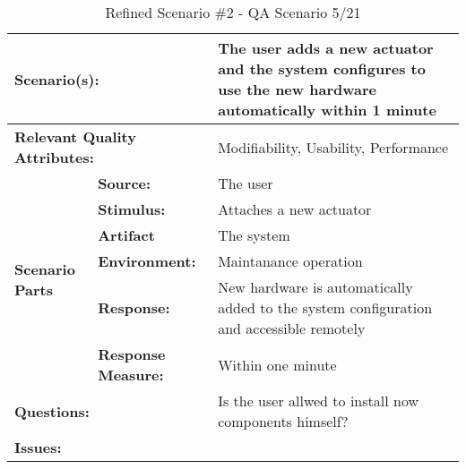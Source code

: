 \documentclass[a4paper,10pt]{article}
\begin{document}
\begin{table}[!htp]
\begin{center}
\begin{tabular}{|p{0.3cm}|p{2.5cm}|p{8cm}|}
  \hline
  \multicolumn{2}{|p{3cm}|}{\bfseries Scenario(s):} & The user adds a new actuator and the system configures to use the new hardware automatically within 1 minute \\
  \hline
  \multicolumn{2}{|p{3cm}|}{\bfseries Relevant Quality Attributes:} & Modifiability, Usability, Performance \\
  \hline
  \multirow{6}{*}{\begin{sideways}{\bfseries Scenario Parts}\end{sideways}}
  & {\bfseries Source:} & The user \\
  \cline{2-3}
  & {\bfseries Stimulus:} & Attaches a new actuator \\
  \cline{2-3}
  & {\bfseries Artifact} & The system \\
  \cline{2-3}
  & {\bfseries Environment:} & Maintanance operation \\
  \cline{2-3}
  & {\bfseries Response:} & New hardware is automatically added to the system configuration and accessible remotely \\
  \cline{2-3}
  & {\bfseries Response \mbox{Measure:}} & Within one minute \\
  \hline
  \multicolumn{2}{|p{3cm}|}{\bfseries Questions:} & Is the user allwed to install now components himself? \\
  \hline
  \multicolumn{2}{|p{3cm}|}{\bfseries Issues:} &  \\
  \hline
\end{tabular}
\caption{Refined Scenario \#2 - QA Scenario 5/21}
\label{scenario2}
\end{center}
\end{table}
\end{document}

